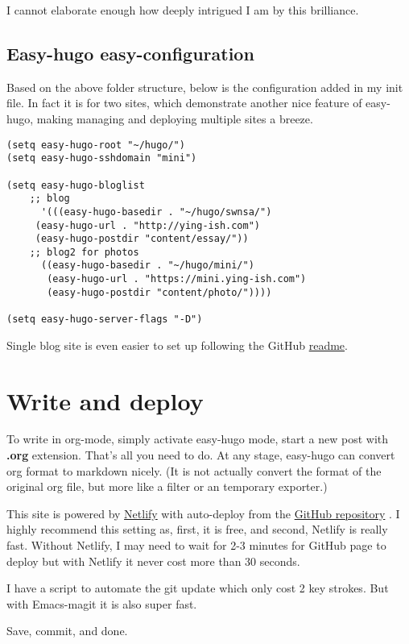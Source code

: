 \documentclass[11pt]{article}
\begin{document}
I cannot elaborate enough how deeply intrigued I am by this brilliance. 

\subsection{Easy-hugo easy-configuration}
\label{sec:org5998df5}
Based on the above folder structure, below is the configuration added in my init file. In fact it is for two sites, which demonstrate another nice feature of easy-hugo, making managing and deploying multiple sites a breeze.

\begin{verbatim}
(setq easy-hugo-root "~/hugo/")
(setq easy-hugo-sshdomain "mini")

(setq easy-hugo-bloglist
	;; blog
      '(((easy-hugo-basedir . "~/hugo/swnsa/")
	 (easy-hugo-url . "http://ying-ish.com")
	 (easy-hugo-postdir "content/essay/"))
	;; blog2 for photos
	  ((easy-hugo-basedir . "~/hugo/mini/")
	   (easy-hugo-url . "https://mini.ying-ish.com")
	   (easy-hugo-postdir "content/photo/"))))

(setq easy-hugo-server-flags "-D")
\end{verbatim}

Single blog site is even easier to set up following the GitHub \href{https://github.com/masasam/emacs-easy-hugo\#sample-configuration}{readme}.

\section{Write and deploy}
\label{sec:org1964176}
To write in org-mode, simply activate easy-hugo mode, start a new post with \textbf{.org} extension. That's all you need to do. At any stage, easy-hugo can convert org format to markdown nicely. (It is not actually convert the format of the original org file, but more like a filter or an temporary exporter.)

This site is powered by \href{https://www.netlify.com/}{Netlify} with auto-deploy from the \href{https://github.com/wpix/swnsa}{GitHub repository} . I highly recommend this setting as, first, it is free, and second, Netlify is really fast. Without Netlify, I may need to wait for 2-3 minutes for GitHub page to deploy but with Netlify it never cost more than 30 seconds. 

I have a script to automate the git update which only cost 2 key strokes. But with Emacs-magit it is also super fast. 

Save, commit, and done.
\end{document}
